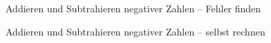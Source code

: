 \begin{aufgabe}{Addieren und Subtrahieren negativer Zahlen – Fehler finden}
\end{aufgabe}

\begin{aufgabe}{Addieren und Subtrahieren negativer Zahlen – selbst rechnen}
\end{aufgabe}
